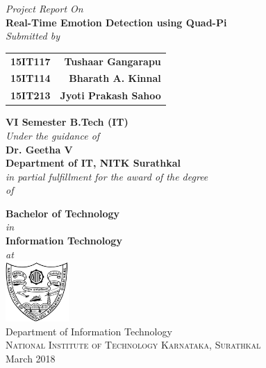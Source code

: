 \begin{titlepage}

\begin{center}
\textup{\small \textit{Project Report On}}\\

\Large \textbf {Real-Time Emotion Detection using Quad-Pi}\\[0.4in]

\normalsize \textit{Submitted by} \\
\begin{table}[h]
\centering
\bgroup
\def\arraystretch{1.4}
\begin{tabular}{lr}
\textbf{15IT117} & \textbf{Tushaar Gangarapu} \\
\textbf{15IT114} & \textbf{Bharath A. Kinnal} \\ 
\textbf{15IT213} & \textbf{Jyoti Prakash Sahoo} \\
\end{tabular}
\egroup
\end{table}

\textbf{VI Semester B.Tech (IT)}\\[0.3in]

\textit{Under the guidance of}\\\vspace{3mm}
{\textbf{Dr. Geetha V}}\\
{\textbf{Department of IT, NITK Surathkal}}\\[0.3in]

       \small \emph{in partial fulfillment for the award of the degree\\\vspace{2mm} of}
        \vspace{.2in}

       {\bf Bachelor of Technology} \\\vspace{2mm} \textit{in} \\\vspace{2mm} {\bf Information Technology} \\\vspace{2mm} \textit{at}\\[0.2in]

\includegraphics[width=0.18\textwidth]{images/logo}\\
\Large{Department of Information Technology}\\
\normalsize
\textsc{National Institute of Technology Karnataka, Surathkal}\\
March 2018 \\
\vspace{0.2cm}

\end{center}

\end{titlepage}
